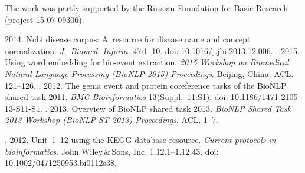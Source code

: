 


\vspace*{-12pt}

\Ack
\noindent
The work was partly supported by the Russian Foundation for Basic
Research (project 15-07-09306).




  \begin{multicols}{2}

\renewcommand{\bibname}{\protect\rmfamily References}

{\small\frenchspacing
 {%
 \begin{thebibliography}{99}
 2014. Ncbi disease 
corpus: A~resource for disease name and concept normalization. 
\textit{J.~Biomed. Inform.} 47:1--10. doi: 10.1016/j.jbi.2013.12.006.
. 
2015. Using word embedding for bio-event extraction. \textit{2015 Workshop on 
Biomedical Natural Language Processing (BioNLP 2015) Proceedings}. Beijing, 
China: ACL. 121--126.
. 
2012. The genia event and protein coreference tasks of the BioNLP shared task 
2011. \textit{BMC Bioinformatics} 13(Suppl.~11:S1).  
doi: 10.1186/1471-2105-13-S11-S1.
. 2013. Overview of BioNLP shared task 2013. 
\textit{BioNLP Shared Task 2013 Workshop (BioNLP-ST 2013) Proceedings}. 
ACL. 1--7.

. 2012. Unit~1--12 using the KEGG database resource. 
\textit{Current protocols in bioinformatics}. 
John Wiley\,\&\,Sons, Inc. 1.12.1--1.12.43.   doi: 
10.1002/0471250953.bi0112s38.


\end{thebibliography}}}
\end{multicols}
